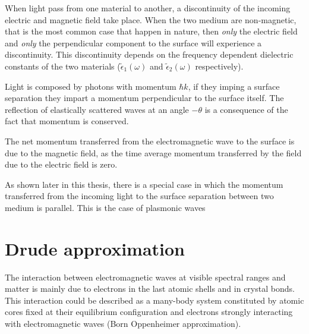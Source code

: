 When light pass from one material to another, a discontinuity of the incoming electric and magnetic field take place. When the two medium are non-magnetic, that is the most common case that happen in nature, then \emph{only} the electric field and \emph{only} the perpendicular component to the surface will experience a discontinuity. This discontinuity depends on the frequency dependent dielectric constants of the two materials ($\widetilde{\epsilon}_1(\omega)$ and $\widetilde{\epsilon}_2(\omega)$ respectively).


Light is composed by photons with momentum $\hbar k$, if they imping a surface separation they impart a momentum perpendicular to the surface itself. The reflection of elastically scattered waves at an angle $-\theta$ is a consequence of the fact that momentum is conserved.

The net momentum transferred from the electromagnetic wave to the surface is due to the magnetic field, as the time average momentum transferred by the field due to the electric field is zero.

As shown later in this thesis, there is a special case in which the momentum transferred from the incoming light to the surface separation between two medium is parallel. This is the case of plasmonic waves 







\section{Drude approximation}


The interaction between electromagnetic waves at visible spectral ranges and matter is mainly due to electrons in the last atomic shells and in crystal bonds. This interaction could be described as a many-body system constituted by atomic cores fixed at their equilibrium configuration and electrons strongly interacting with electromagnetic waves (Born Oppenheimer approximation). %


